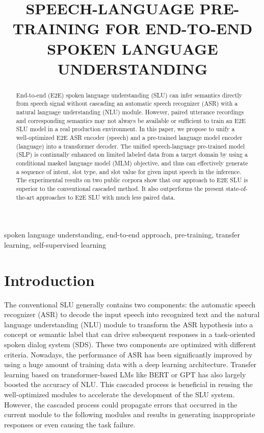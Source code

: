 \documentclass{article}
\title{SPEECH-LANGUAGE PRE-TRAINING FOR END-TO-END SPOKEN LANGUAGE UNDERSTANDING}
\begin{document}
\ninept
\maketitle
\begin{abstract}
End-to-end (E2E) spoken language understanding (SLU) can infer semantics directly from speech signal without cascading an automatic speech recognizer (ASR) with a natural language understanding (NLU) module. However, paired utterance recordings and corresponding semantics may not always be available or sufficient to train an E2E SLU model in a real production environment. In this paper, we propose to unify a well-optimized E2E ASR encoder (speech) and a pre-trained language model encoder (language) into a transformer decoder. The unified speech-language pre-trained model (SLP) is continually enhanced on limited labeled data from a target domain by using a conditional masked language model (MLM) objective, and thus can effectively generate a sequence of intent, slot type, and slot value for given input speech in the inference. The experimental results on two public corpora show that our approach to E2E SLU is superior to the conventional cascaded method. It also outperforms the present state-of-the-art approaches to E2E SLU with much less paired data.
\end{abstract}
\begin{keywords}
spoken language understanding, end-to-end approach, pre-training, transfer learning, self-supervised learning
\end{keywords}
\section{Introduction}
\label{sec:intro}

The conventional SLU generally contains two components: the automatic speech recognizer (ASR) to decode the input speech into recognized text and the natural language understanding (NLU) module to transform the ASR hypothesis into a concept or semantic label that can drive subsequent responses in a task-oriented spoken dialog system (SDS). These two components are optimized with different criteria. Nowadays, the performance of ASR has been significantly improved by using a huge amount of training data with a deep learning architecture. Transfer learning based on transformer-based LMs like BERT \cite{DBLP:journals/corr/abs-1810-04805} or GPT \cite{radford2019language} has also largely boosted the accuracy of NLU. This cascaded process is beneficial in reusing the well-optimized modules to accelerate the development of the SLU system. However, the cascaded process could propagate errors that occurred in the current module to the following modules and results in generating inappropriate responses or even causing the task failure.   
\end{document}
